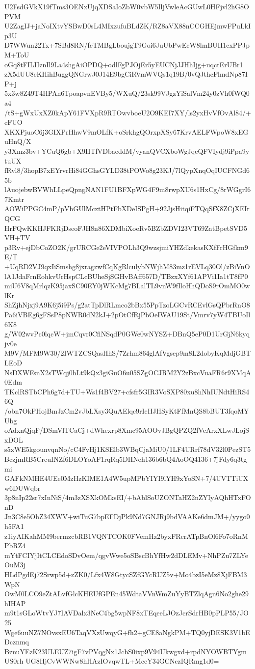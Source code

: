 U2FsdGVkX19fTms3OENxUjqXDSaIoZbW0vbW5IljVwleAcGUwL0HFjvl2hG8OPVM
U2ZagIJ+jaNoIXtvYSBwD0sL4MIxzufuBLdZK/RZ8aVX88nCCGHEjmwFPuLkIp3U
D7WWun22Tx+7SBd8RN/fcTMBgLboujgT9Goi6JuUbPwEcW8lmBUH1cxPPJpM+ToU
oGq8tFILIIznIl9La4shgAiOPDQ+odlFgPJOjEr5yEUCNjJJHhIjg+uqctErUBr1
zX5dUU8cKHihBuggQNGrwJ0J14E9bgCiRVmWVQs1q19B/0vQJthcFhndNp87IP+j
5x3w8Z49T4HPAn6TpoapvnEVBy5/WXuQ/23sk99VJgzYiSalVm24y0zVh0fWQ0a4
/tS+gWxUxXZ0kApY61FVXpR9RTOwvboeU2O9KEI7XY/ls2yxHvVfOvAl84/+cFUO
XKXPjuoC6j3GIXPrHhwV9mOLfK+oSrkhgQOrxpXSy67KrvAELFWpoW8xEGuHnQ/X
y3Xmz3bv+YCuQ6gb+X9HTfVDbaeddM/vyanQVCXboWgJqeQFVIydj9iPpa9ytuUX
fRvl8/3hopB7xEYrvrHi84GGhsGYLD38tPOWo8g23KJ/7lQypXnqOqIUCFNGd65b
lAuojebwBVWhLLpeQpngNAN1FU1BFXpWG4F9m8rwpXU6s1HxCg/8rWGgrI67Kmtr
AOWiPPGC4mP/pVbGUlMcztHPtFbXDeISPgH+92JjsHitqiFTQqSfX8ZCjXEIrQCG
HrFQwKKHJFKRjDseoFJH8n86XDMbiXoeRv5BZbZDVI23VT69ZatBpetSVD5VH+TV
p3Rv+ejDbCoZO2K/grURCGe2eVIVPOLh3Q9wzsjmiYHZdkekasKXfFrHGfkm9E/T
+UqRD2VJ9qxIiSmshg8jxragzwfCqKgRlculybNWjhM83mz1rEVLq30Ol/zBiVnO
lA1JdaFcnEohkvUrHspCLcBUheSjSGHvBAff657D/TBzxXYf61APVi1Ia1tT8fP0
miU6V8qMrlqzK95jaxSC90EY0jWKcMg7BLalTL9vnW9fIloHhQDoS9rOmMO0wlKr
ShZjhNjxj9A9K6j5i9Ps/g2atTpDlRLmco2bBx55PpTzoLGCvRCEvlGsQPbrRnO8
Pa6iVBEg6gFSsP8pNWR0dN2kJ+2pOtCfRjPbOeIWAU19St/Vmrv7yW4TBUoIl6K8
g/W02wvPc0lqcW+jmCqvr0CfiNSqdP0GWe0wNYSZ+DBnQ5eP0D1UrGjN6kyqjv0e
M9V/MFM9W30/2IWTZCSQasHhS/7Zrhm864glAfVgsep9m8L2dobyKqMdjGBTLEoD
NsDXWFsnX2sTWqj0hLt9kQx3giGuO6u05SZgOCJRM2Y2zBxcVuaFR6r9XMqA0Edm
TKclRSTbCPh6g7d+TU+Ws1f4BV27+cfsfr5GIR3VoSXP80xu8hNhIUNdtHiRS46Q
/obn7OkPHojBmJzCm2vJbLXsy3QuAElqc9rIeHJHSyKtFfMnQS8bBUT3fqoMYUbg
oAdxnQjqF/DSmVlTCaCj+dWhexrp8Xmc95AOOvJBgQPZQ2fVcArxXLwJLojSxDOL
s5xWE5kgounvqnNo/cC4FvHj1KSElb3WBqCjaMiU0/1LF4URrf78dV32l0PezST5
BczjmRB5CrcuINZf6DLOYoAF1rqRq5DHNeh136b6bQ4AoOQ4136+7jFdy6q3tgmi
GAFkNMHE4UEe0MzHzKIME1A4W5upMPbYIYI9lYH9xYoSN+7/4UVTTiUXw6DUWqbr
3p8nIp22sr7xInNiS/4m3zXSXkOMksEI/+bAblSoUZONTaHZ2nZYIyAQhHTxFOnD
Jn3C8e5OhZ34XWV+wiTuG7bpEFDjPk9Nd7GNJRj9bdVAAKe6dmJM+/yygo0h5FA1
z1iyAIKahMM9bermzcbRB1VQNTCOK0FVemHz2byxFRcrATpBnOl6Fo7oRnMPbRZ4
mYtFCIYjItCLCEdoSDvOem/qgvWwe5oSBscBhYfHw2dDLEMv+NhPZu7ZLYeOuM3j
HLdPgdEj72Srwp5d+zZK0/Lfx4W8GtycSZfGYcRUZ5v+Mo4bzI5eMz8XjFBM3WpN
OwM0LCO9eZtALvfGlcKHEUfGPEn45WdtaVVnWmZuYyBTZlqAgn6No2ghe29hIHAP
m9t1sGLoWtvYJ7IAVDalx3NeC4bg5wpNF8xTEqeeLJOzJcrSdrHB0pPLP55/JO25
Wge6uuNZ7NOvsxEU6TaqVXzUwqyG+fh2+gCE8aNgkPM+TQ0yjDESK3V1bEDcznmq
BznuYEzK23ULEUZ7igF7vPVqgNx1JcbS0ixp9V94Ukwgxd+rpdNYOWBTYgmUS0rh
UG8HjCvWWNw8hHAzIOvqwTL+MceY34GCNczIQRmg1d0=
